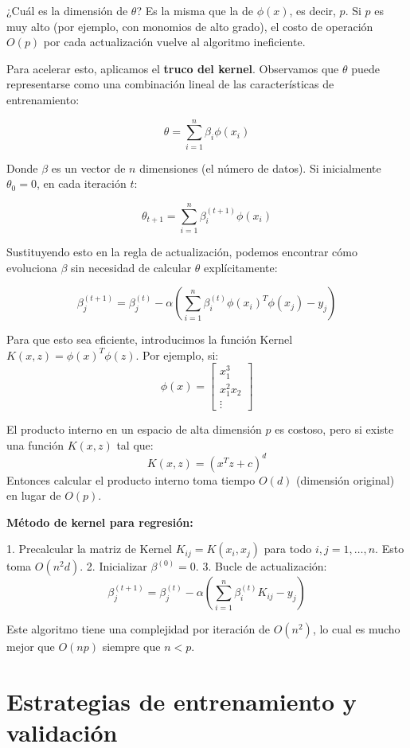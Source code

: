 ¿Cuál es la dimensión de $\theta$? Es la misma que la de $\phi(x)$, es decir, $p$. Si $p$ es muy alto (por ejemplo, con monomios de alto grado), el costo de operación $O(p)$ por cada actualización vuelve al algoritmo ineficiente.

Para acelerar esto, aplicamos el \textbf{truco del kernel}. Observamos que $\theta$ puede representarse como una combinación lineal de las características de entrenamiento:

\[ \theta = \sum_{i=1}^n \beta_i \phi(x_i) \]

Donde $\beta$ es un vector de $n$ dimensiones (el número de datos). Si inicialmente $\theta_0 = 0$, en cada iteración $t$:

\[ \theta_{t+1} = \sum_{i=1}^n \beta_i^{(t+1)} \phi(x_i) \]

Sustituyendo esto en la regla de actualización, podemos encontrar cómo evoluciona $\beta$ sin necesidad de calcular $\theta$ explícitamente:

\[ \beta_j^{(t+1)} = \beta_j^{(t)} - \alpha \left( \sum_{i=1}^n \beta_i^{(t)} \phi(x_i)^T \phi(x_j) - y_j \right) \]

Para que esto sea eficiente, introducimos la función Kernel $K(x, z) = \phi(x)^T \phi(z)$. Por ejemplo, si:
\[ \phi(x) = \begin{bmatrix} x_1^3 \\ x_1^2 x_2 \\ \vdots \end{bmatrix} \]

El producto interno en un espacio de alta dimensión $p$ es costoso, pero si existe una función $K(x, z)$ tal que:
\[ K(x, z) = (x^T z + c)^d \]
Entonces calcular el producto interno toma tiempo $O(d)$ (dimensión original) en lugar de $O(p)$.

\textbf{Método de kernel para regresión:}

1. Precalcular la matriz de Kernel $K_{ij} = K(x_i, x_j)$ para todo $i, j = 1, \dots, n$. Esto toma $O(n^2 d)$.
2. Inicializar $\beta^{(0)} = 0$.
3. Bucle de actualización:
\[ \beta_j^{(t+1)} = \beta_j^{(t)} - \alpha \left( \sum_{i=1}^n \beta_i^{(t)} K_{ij} - y_j \right) \]

Este algoritmo tiene una complejidad por iteración de $O(n^2)$, lo cual es mucho mejor que $O(np)$ siempre que $n < p$.
\section{Estrategias de entrenamiento y validación}

